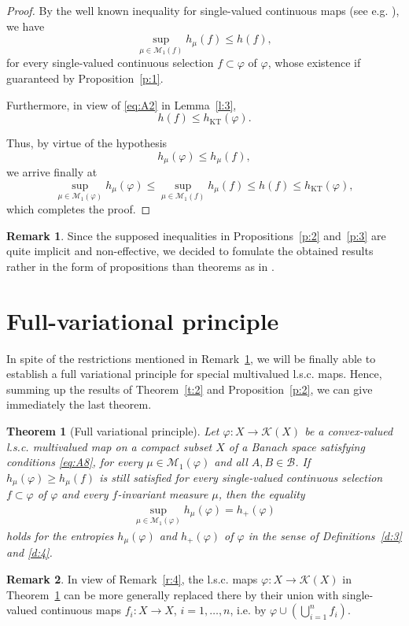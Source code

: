 \documentclass[12pt]{amsart}
\newtheorem{thm}{Theorem}
\theoremstyle{definition}
\newtheorem{remark}{Remark}
\newcommand{\M}{{\mathcal{M}}}
\newcommand{\KK}{\mathcal K}
\newcommand{\vp}{\varphi}
\newcommand{\B}{{\mathcal{B}}}
\newcommand{\KT}{\operatorname{KT}}
\newcommand{\hKT}{h_{\KT}}
\begin{document}
\begin{proof}
By the well known inequality for single-valued continuous maps (see e.g. \cite{Go1}), we have
\[
\sup_{\mu\in\M_1(f)} h_\mu(f) \leq h(f),
\]
for every single-valued continuous selection $f\subset \vp$ of $\vp$, whose existence if guaranteed by Proposition~\ref{p:1}.

Furthermore, in view of \eqref{eq:A2} in Lemma~\ref{l:3},
\[
h(f) \leq \hKT(\vp).
\]

Thus, by virtue of the hypothesis
\[
h_\mu(\vp) \leq h_\mu(f),
\]
we arrive finally at
\[
\sup_{\mu\in\M_1(\vp)} h_\mu(\vp) \leq \sup_{\mu\in\M_1(f)} h_\mu(f) \leq h(f) \leq \hKT(\vp),		
\]
which completes the proof.

\end{proof}

\begin{remark}\label{r:5}
Since the supposed inequalities in Propositions~\ref{p:2} and~\ref{p:3} are quite implicit and non-effective, we decided to fomulate the obtained results rather in the form of propositions than theorems as in \cite{VS}.
\end{remark}

\section{Full-variational principle}
In spite of the restrictions mentioned in Remark~\ref{r:5}, we will be finally able to establish a full variational principle for special multivalued l.s.c. maps. Hence, summing up the results of Theorem~\ref{t:2} and Proposition~\ref{p:2}, we can give immediately the last theorem.

\begin{thm}[Full variational principle]\label{t:4}
Let $\vp:X\to\KK(X)$ be a convex-valued l.s.c. multivalued map on a compact subset $X$ of a Banach space satisfying conditions \eqref{eq:A8}, for every $\mu\in\M_1(\vp)$ and all $A,B\in\B$. If $h_\mu(\vp)\geq h_\mu(f)$ is still satisfied for every single-valued continuous selection $f\subset\vp$ of $\vp$ and every $f$-invariant measure $\mu$, then the equality
\begin{align*}
\sup_{\mu\in\M_1(\vp)} h_\mu(\vp) = h_+(\vp)
\end{align*}
holds for the entropies $h_\mu(\vp)$ and $h_+(\vp)$ of $\vp$ in the sense of Definitions~\ref{d:3} and \ref{d:4}.
\end{thm}

\begin{remark}\label{r:6}
In view of Remark~\ref{r:4}, the l.s.c. maps $\vp:X\to\KK(X)$ in Theorem~\ref{t:4} can be more generally replaced there by their union with single-valued continuous maps $f_i: X\to X$, $i=1,\ldots,n$, i.e. by $\vp\cup (\bigcup_{i=1}^{n}f_i)$.
\end{remark}
\end{document}
